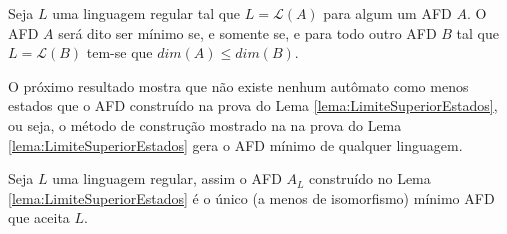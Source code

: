 \begin{definition}
	Seja $L$ uma linguagem regular tal que $L = \mathcal{L}(A)$ para algum um AFD $A$. O AFD $A$ será dito ser mínimo se, e somente se,  e para todo outro AFD $B$ tal que $L= \mathcal{L}(B)$ tem-se que $dim(A) \leq dim(B)$. 
\end{definition}

O próximo resultado mostra que não existe nenhum autômato como menos estados que o AFD construído na prova do Lema \ref{lema:LimiteSuperiorEstados}, ou seja, o método de construção mostrado na  na prova do Lema \ref{lema:LimiteSuperiorEstados} gera o AFD mínimo de qualquer linguagem.

\begin{lemma}\label{lema:UnicadadeMinAFD}
	Seja $L$ uma linguagem regular, assim o  AFD $A_L$ construído no Lema \ref{lema:LimiteSuperiorEstados} é o único (a menos de isomorfismo) mínimo AFD que aceita $L$.
\end{lemma}

